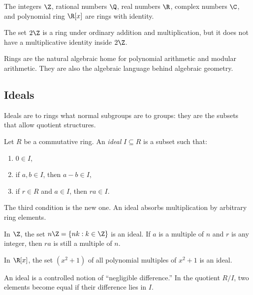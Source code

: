 \begin{example}
The integers $\Z$, rational numbers $\Q$, real numbers $\R$, complex numbers
$\C$, and polynomial ring $\R[x]$ are rings with identity.
\end{example}

\begin{example}
The set $2\Z$ is a ring under ordinary addition and multiplication, but it does
not have a multiplicative identity inside $2\Z$.
\end{example}

Rings are the natural algebraic home for polynomial arithmetic and modular
arithmetic. They are also the algebraic language behind algebraic geometry.

\subsection{Ideals}

Ideals are to rings what normal subgroups are to groups: they are the subsets
that allow quotient structures.

\begin{definition}
Let $R$ be a commutative ring. An \emph{ideal} $I\subseteq R$ is a subset such
that:
\begin{enumerate}
\item $0\in I$,
\item if $a,b\in I$, then $a-b\in I$,
\item if $r\in R$ and $a\in I$, then $ra\in I$.
\end{enumerate}
\end{definition}

The third condition is the new one. An ideal absorbs multiplication by arbitrary
ring elements.

\begin{example}
In $\Z$, the set $n\Z=\{nk:k\in\Z\}$ is an ideal. If $a$ is a multiple of $n$
and $r$ is any integer, then $ra$ is still a multiple of $n$.
\end{example}

\begin{example}
In $\R[x]$, the set $(x^2+1)$ of all polynomial multiples of $x^2+1$ is an
ideal.
\end{example}

\begin{intuitionbox}
An ideal is a controlled notion of ``negligible difference.'' In the quotient
$R/I$, two elements become equal if their difference lies in $I$.
\end{intuitionbox}

